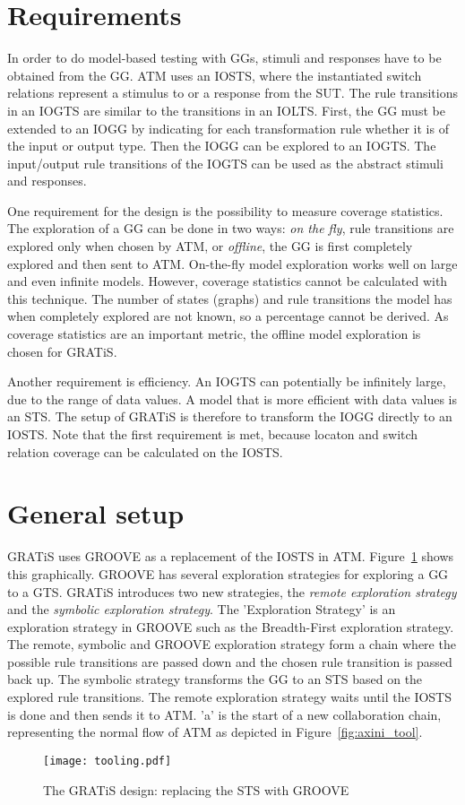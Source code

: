 \section{Requirements}\label{sec:requirements}
In order to do model-based testing with GGs, stimuli and responses have to be obtained from the GG. ATM uses an IOSTS, where the instantiated switch relations represent a stimulus to or a response from the SUT. The rule transitions in an IOGTS are similar to the transitions in an IOLTS. First, the GG must be extended to an IOGG by indicating for each transformation rule whether it is of the input or output type. Then the IOGG can be explored to an IOGTS. The input/output rule transitions of the IOGTS can be used as the abstract stimuli and responses.

One requirement for the design is the possibility to measure coverage statistics. The exploration of a GG can be done in two ways: \textit{on the fly}, rule transitions are explored only when chosen by ATM, or \textit{offline}, the GG is first completely explored and then sent to ATM. On-the-fly model exploration works well on large and even infinite models. However, coverage statistics cannot be calculated with this technique. The number of states (graphs) and rule transitions the model has when completely explored are not known, so a percentage cannot be derived. As coverage statistics are an important metric, the offline model exploration is chosen for GRATiS.

Another requirement is efficiency. An IOGTS can potentially be infinitely large, due to the range of data values. A model that is more efficient with data values is an STS. The setup of GRATiS is therefore to transform the IOGG directly to an IOSTS. Note that the first requirement is met, because locaton and switch relation coverage can be calculated on the IOSTS.

\section{General setup}\label{sec:general-setup}
GRATiS uses GROOVE as a replacement of the IOSTS in ATM. Figure~\ref{fig:tooling} shows this graphically. GROOVE has several exploration strategies for exploring a GG to a GTS. GRATiS introduces two new strategies, the \textit{remote exploration strategy} and the \textit{symbolic exploration strategy}. The 'Exploration Strategy' is an exploration strategy in GROOVE such as the Breadth-First exploration strategy. The remote, symbolic and GROOVE exploration strategy form a chain where the possible rule transitions are passed down and the chosen rule transition is passed back up. The symbolic strategy transforms the GG to an STS based on the explored rule transitions. The remote exploration strategy waits until the IOSTS is done and then sends it to ATM. 'a' is the start of a new collaboration chain, representing the normal flow of ATM as depicted in Figure~\ref{fig:axini_tool}.

\begin{figure}[ht]
  \begin{center}
    \texttt{[image: tooling.pdf]}
  \end{center}
  \caption{The GRATiS design: replacing the STS with GROOVE}
  \label{fig:tooling}
\end{figure}
